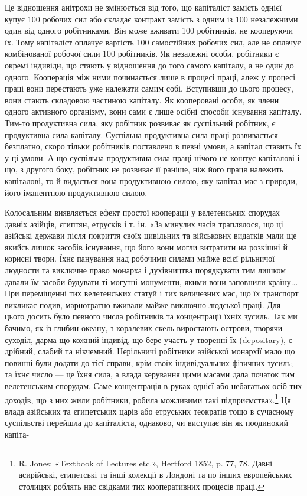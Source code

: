 Це відношення анітрохи не змінюється від того, що капіталіст
замість однієї купує 100 робочих сил або складає контракт замість
з одним із 100 незалежними один від одного робітниками. Він може
вживати 100 робітників, не кооперуючи їх. Тому капіталіст
оплачує вартість 100 самостійних робочих сил, але не оплачує
комбінованої робочої сили 100 робітників. Як незалежні особи,
робітники є окремі індивіди, що стають у відношення до того
самого капіталу, а не один до одного. Кооперація між ними починається
лише в процесі праці, алеж у процесі праці вони перестають
уже належати самим собі. Вступивши до цього процесу,
вони стають складовою частиною капіталу. Як кооперовані
особи, як члени одного активного організму, вони сами є лише
осібні способи існування капіталу. Тим-то продуктивна сила,
яку робітник розвиває як суспільний робітник, є продуктивна
сила капіталу. Суспільна продуктивна сила праці розвивається
безплатно, скоро тільки робітників поставлено в певні умови,
а капітал ставить їх у ці умови. А що суспільна продуктивна
сила праці нічого не коштує капіталові і що, з другого боку, робітник
не розвиває її раніше, ніж його праця належить капіталові,
то й видається вона продуктивною силою, яку капітал має з
природи, його іманентною продуктивною силою.

Колосальним виявляється ефект простої кооперації у велетенських
спорудах давніх азійців, єгиптян, етрусків і т. ін.
«За минулих часів траплялося, що ці азійські держави після
покриття своїх цивільних та військових видатків мали ще якийсь
лишок засобів існування, що його вони могли витратити на розкішні
й корисні твори. Їхнє панування над робочими силами майже
всієї рільничої людности та виключне право монарха і духівництва
порядкувати тим лишком давали їм засоби будувати ті
могутні монументи, якими вони заповнили країну... При переміщенні
тих велетенських статуй і тих величезних мас, що їх
транспорт викликає подив, марнотратно вживали майже виключно
людської праці. Для цього досить було певного числа робітників
та концентрації їхніх зусиль. Так ми бачимо, як із глибин океану,
з коралевих скель виростають острови, творячи суходіл, дарма
що кожний індивід, що бере участь у творенні їх (depositary),
є дрібний, слабий та нікчемний. Нерільничі робітники азійської
монархії мало що повинні були додати до тієї справи, крім
своїх індивідуальних фізичних зусиль; та їхнє число — це їхня
сила, а влада керування цими масами дала початок тим велетенським
спорудам. Саме концентрація в руках однієї або небагатьох
осіб тих доходів, що з них жили робітники, робила можливими
такі підприємства».\footnote{
R. Jones: «Textbook of Lectures etc.», Hertford 1852, p. 77, 78.
Давні асирійські, єгипетські та інші колекції в Лондоні та по інших
европейських столицях роблять нас свідками тих кооперативних процесів
праці.
} Ця влада азійських та єгипетських царів
або етруських теократів тощо в сучасному суспільстві перейшла
до капіталіста, однаково, чи виступає він як поодинокий капіта-